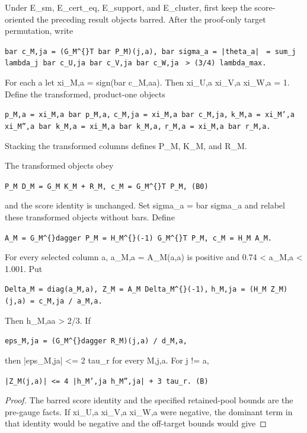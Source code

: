 \begin{lemma}\label{lem:step-007-dual-equation}

Under E\_sm, E\_cert\_eq, E\_support, and E\_cluster, first keep the score-oriented
the preceding result objects barred.  After the proof-only target permutation, write

\texttt{bar c\_M,ja = (G\_M\textasciicircum\{\}T bar P\_M)(j,a),   bar sigma\_a = |theta\_a|}
\texttt{  = sum\_j lambda\_j bar c\_U,ja bar c\_V,ja bar c\_W,ja}
\texttt{  > (3/4) lambda\_max.}

For each a let xi\_M,a = sign(bar c\_M,aa).  Then
xi\_U,a xi\_V,a xi\_W,a = 1.  Define the transformed, product-one objects

\texttt{p\_M,a = xi\_M,a bar p\_M,a,}
\texttt{c\_M,ja = xi\_M,a bar c\_M,ja,}
\texttt{k\_M,a = xi\_M',a xi\_M'',a bar k\_M,a = xi\_M,a bar k\_M,a,}
\texttt{r\_M,a = xi\_M,a bar r\_M,a.}

Stacking the transformed columns defines P\_M, K\_M, and R\_M.

The transformed objects obey

\texttt{P\_M D\_M = G\_M K\_M + R\_M,   c\_M = G\_M\textasciicircum\{\}T P\_M,                 (B0)}

and the score identity is unchanged.  Set sigma\_a = bar sigma\_a and relabel
these transformed objects without bars.  Define

\texttt{A\_M = G\_M\textasciicircum\{\}dagger P\_M = H\_M\textasciicircum\{\}(-1) G\_M\textasciicircum\{\}T P\_M,   c\_M = H\_M A\_M.}

For every selected column a, a\_M,a = A\_M(a,a) is positive and
0.74 < a\_M,a < 1.001.  Put

\texttt{Delta\_M = diag(a\_M,a),   Z\_M = A\_M Delta\_M\textasciicircum\{\}(-1),}
\texttt{h\_M,ja = (H\_M Z\_M)(j,a) = c\_M,ja / a\_M,a.}

Then h\_M,aa > 2/3.  If

\texttt{eps\_M,ja = (G\_M\textasciicircum\{\}dagger R\_M)(j,a) / d\_M,a,}

then |eps\_M,ja| <= 2 tau\_r for every M,j,a.  For j != a,

\texttt{|Z\_M(j,a)| <= 4 |h\_M',ja h\_M'',ja| + 3 tau\_r.                 (B)}

\begin{proof}

The barred score identity and the specified retained-pool bounds are the
pre-gauge facts.  If xi\_U,a xi\_V,a xi\_W,a were negative, the dominant term
in that identity would be negative and the off-target bounds would give


\end{proof}
\end{lemma}
